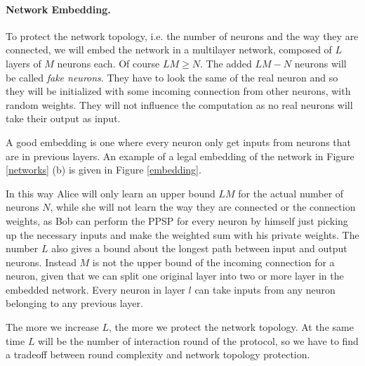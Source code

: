 \documentclass[11pt,oribibl,runningheads]{llncs}
\begin{document}
\paragraph{Network Embedding.}
To protect the network topology, i.e. the number of neurons and
the way they are connected, we will embed the network in a
multilayer network, composed of $L$ layers of $M$ neurons each. Of
course $LM \geq N$. The added $LM - N$ neurons will be called {\em
fake neurons}. They have to look the same of the real neuron and
so they will be initialized with some incoming connection from
other neurons, with random weights. They will not influence the
computation as no real neurons will take their output as input.

A good embedding is one where every neuron only get inputs from
neurons that are in previous layers. An example of a legal embedding
of the network in Figure \ref{networks} (b) is given in Figure
\ref{embedding}.

In this way Alice will only learn an upper bound $LM$ for the
actual number of neurons $N$, while she will not learn the way
they are connected or the connection weights, as Bob can perform
the \textsc{PPSP} for every neuron by himself just picking up the
necessary inputs and make the weighted sum with his private
weights. The number $L$ also gives a bound about the longest path
between input and output neurons. Instead $M$ is not the upper bound of the incoming connection for a neuron, given that 
we can split one original layer into two or more layer in the embedded network. Every neuron in layer $l$ can take inputs from any neuron belonging to any previous layer.

The more we increase $L$, the more we protect the network topology. At the same
time $L$ will be the number of interaction round of the protocol, so
we have to find a tradeoff between round complexity and network
topology protection. 
\end{document}
